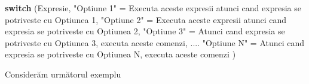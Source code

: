 \documentclass[]{article}
\newenvironment{Shaded}{\begin{snugshade}}{\end{snugshade}}
\newcommand{\DecValTok}[1]{\textcolor[rgb]{0.00,0.00,0.81}{#1}}
\newcommand{\StringTok}[1]{\textcolor[rgb]{0.31,0.60,0.02}{#1}}
\newcommand{\ControlFlowTok}[1]{\textcolor[rgb]{0.13,0.29,0.53}{\textbf{#1}}}
\newcommand{\NormalTok}[1]{#1}
\begin{document}
\begin{Shaded}
\begin{Highlighting}[]
\ControlFlowTok{switch}\NormalTok{ (Expresie,}
        \StringTok{"Optiune 1"}\NormalTok{ =}\StringTok{ }\NormalTok{Executa aceste expresii atunci cand expresia se }
\NormalTok{                      potriveste cu Optiunea }\DecValTok{1}\NormalTok{,}
        \StringTok{"Optiune 2"}\NormalTok{ =}\StringTok{ }\NormalTok{Executa aceste expresii atunci cand expresia se }
\NormalTok{                      potriveste cu Optiunea }\DecValTok{2}\NormalTok{,}
        \StringTok{"Optiune 3"}\NormalTok{ =}\StringTok{ }\NormalTok{Atunci cand expresia se potriveste cu Optiunea }\DecValTok{3}\NormalTok{, }
\NormalTok{                      executa aceste comenzi,}
\NormalTok{        ....}
        \StringTok{"Optiune N"}\NormalTok{ =}\StringTok{ }\NormalTok{Atunci cand expresia se potriveste cu Optiunea N, }
\NormalTok{                      executa aceste comenzi}
\NormalTok{)}
\end{Highlighting}
\end{Shaded}

Considerăm următorul exemplu
\end{document}
